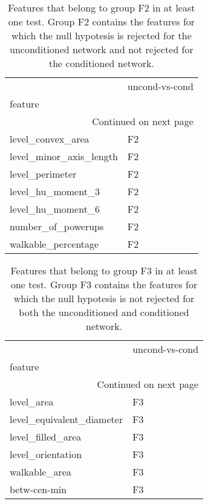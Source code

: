 \documentclass{report}
\begin{document}
\begin{longtable}{ll}
	\caption[Features belonging to the F2 group]{ \small Features that belong to group F2 in at least one test. Group F2 contains the features for which the null hypotesis is rejected for the unconditioned network and not rejected for the conditioned network.}\\
	\toprule
	{} & uncond-vs-cond \\
	feature                 &                \\
	\midrule
	\endhead
	\midrule
	\multicolumn{2}{r}{{Continued on next page}} \\
	\midrule
	\endfoot
	
	\bottomrule
	\endlastfoot
	level\_convex\_area       &             F2 \\
	level\_minor\_axis\_length &             F2 \\
	level\_perimeter         &             F2 \\
	level\_hu\_moment\_3       &             F2 \\
	level\_hu\_moment\_6       &             F2 \\
	number\_of\_powerups      &             F2 \\
	walkable\_percentage     &             F2 \\
\end{longtable}
\begin{longtable}{ll}
	\caption[Features belonging to the F3 group]{ \small Features that belong to group F3 in at least one test. Group F3 contains the features for which the null hypotesis is not rejected for both the unconditioned and conditioned network.}\\
	\toprule
	{} & uncond-vs-cond \\
	feature                   &                \\
	\midrule
	\endhead
	\midrule
	\multicolumn{2}{r}{{Continued on next page}} \\
	\midrule
	\endfoot
	
	\bottomrule
	\endlastfoot
	level\_area                &             F3 \\
	level\_equivalent\_diameter &             F3 \\
	level\_filled\_area         &             F3 \\
	level\_orientation         &             F3 \\
	walkable\_area             &             F3 \\
	betw-cen-min              &             F3 \\
\end{longtable}
\end{document}
